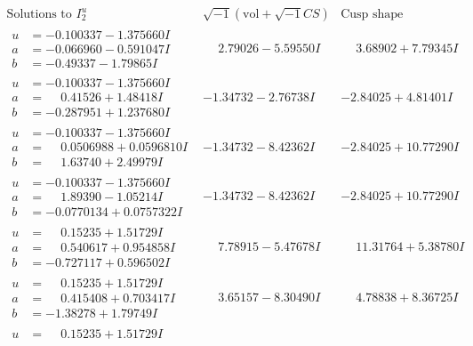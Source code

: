 \documentclass[1p]{elsarticle_modified}
\theoremstyle{definition}
\newcommand{\I}{\sqrt{-1}}
\begin{document}
$$\begin{array}{c|c|c}
\text{Solutions to }I^u_{2}& \I (\text{vol} + \sqrt{-1}CS) & \text{Cusp shape}\\
 \hline 
\begin{aligned}
u &= -0.100337 - 1.375660 I \\
a &= -0.066960 - 0.591047 I \\
b &= -0.49337 - 1.79865 I\end{aligned}
 & \phantom{-}2.79026 - 5.59550 I & \phantom{-}3.68902 + 7.79345 I \\ \hline\begin{aligned}
u &= -0.100337 - 1.375660 I \\
a &= \phantom{-}0.41526 + 1.48418 I \\
b &= -0.287951 + 1.237680 I\end{aligned}
 & -1.34732 - 2.76738 I & -2.84025 + 4.81401 I \\ \hline\begin{aligned}
u &= -0.100337 - 1.375660 I \\
a &= \phantom{-}0.0506988 + 0.0596810 I \\
b &= \phantom{-}1.63740 + 2.49979 I\end{aligned}
 & -1.34732 - 8.42362 I & -2.84025 + 10.77290 I \\ \hline\begin{aligned}
u &= -0.100337 - 1.375660 I \\
a &= \phantom{-}1.89390 - 1.05214 I \\
b &= -0.0770134 + 0.0757322 I\end{aligned}
 & -1.34732 - 8.42362 I & -2.84025 + 10.77290 I \\ \hline\begin{aligned}
u &= \phantom{-}0.15235 + 1.51729 I \\
a &= \phantom{-}0.540617 + 0.954858 I \\
b &= -0.727117 + 0.596502 I\end{aligned}
 & \phantom{-}7.78915 - 5.47678 I & \phantom{-}11.31764 + 5.38780 I \\ \hline\begin{aligned}
u &= \phantom{-}0.15235 + 1.51729 I \\
a &= \phantom{-}0.415408 + 0.703417 I \\
b &= -1.38278 + 1.79749 I\end{aligned}
 & \phantom{-}3.65157 - 8.30490 I & \phantom{-}4.78838 + 8.36725 I \\ \hline\begin{aligned}
u &= \phantom{-}0.15235 + 1.51729 I \\

\end{aligned}
\end{array}$$
\end{document}
